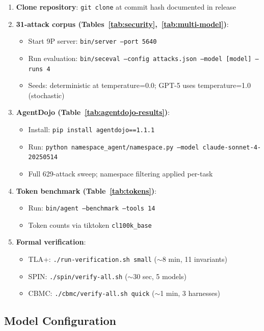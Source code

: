 \documentclass{article}
\begin{document}
\begin{enumerate}
    \item \textbf{Clone repository}: \texttt{git clone} at commit hash documented in release
    \item \textbf{31-attack corpus (Tables~\ref{tab:security},~\ref{tab:multi-model})}:
    \begin{itemize}
        \item Start 9P server: \texttt{bin/server --port 5640}
        \item Run evaluation: \texttt{bin/seceval --config attacks.json --model [model] --runs 4}
        \item Seeds: deterministic at temperature=0.0; GPT-5 uses temperature=1.0 (stochastic)
    \end{itemize}
    \item \textbf{AgentDojo (Table~\ref{tab:agentdojo-results})}:
    \begin{itemize}
        \item Install: \texttt{pip install agentdojo==1.1.1}
        \item Run: \texttt{python namespace\_agent/namespace.py --model claude-sonnet-4-20250514}
        \item Full 629-attack sweep; namespace filtering applied per-task
    \end{itemize}
    \item \textbf{Token benchmark (Table~\ref{tab:tokens})}:
    \begin{itemize}
        \item Run: \texttt{bin/agent --benchmark --tools 14}
        \item Token counts via tiktoken \texttt{cl100k\_base}
    \end{itemize}
    \item \textbf{Formal verification}:
    \begin{itemize}
        \item TLA+: \texttt{./run-verification.sh small} ($\sim$8 min, 11 invariants)
        \item SPIN: \texttt{./spin/verify-all.sh} ($\sim$30 sec, 5 models)
        \item CBMC: \texttt{./cbmc/verify-all.sh quick} ($\sim$1 min, 3 harnesses)
    \end{itemize}
\end{enumerate}

\subsection{Model Configuration}
\end{document}

